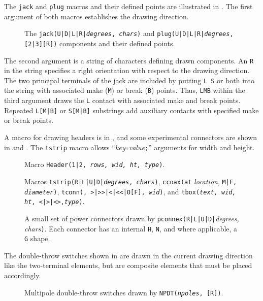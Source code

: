 The {\tt jack} and {\tt plug} macros and their defined points are
illustrated in .
The first argument of both macros establishes the drawing direction.
\begin{figure}[!ht]
   
   \vspace{-1ex}
   \caption{The {\tt jack(U|D|L|R|{\sl degrees}, {\sl chars})}
    and {\tt plug(U|D|L|R|{\sl degrees},[2|3][R])} components
    and their defined points.}
   \label{Jack}
   \end{figure}
 The second argument is a string of characters defining drawn components.
 An {\tt R} in the string specifies a
 right orientation with respect to the drawing direction.
 The two principal terminals of
 the jack are included by putting \hbox{{\tt L} {\tt S}}
 or both into the string with associated make ({\tt M})
 or break ({\tt B}) points.  Thus, {\tt LMB} within the third
 argument draws the {\tt L} contact with
 associated make and break points. Repeated {\tt L[M|B]}
 or {\tt S[M|B]} substrings add auxiliary contacts with 
 specified make or break points.

A macro for drawing headers is in ,
and some experimental connectors are shown in  and .
The {\tt tstrip} macro allows ``{\sl key}{\tt =}{\sl value}{\tt ;}'' arguments
for width and height.
\begin{figure}[h!b]
   
   \caption{Macro {\tt Header(1|2, {\sl rows, wid, ht, type})}.}
   \label{Headers}
   \end{figure}
\begin{figure}[h!b]
   
   \caption{Macros {\tt tstrip(R|L|U|D|{\sl degrees}, {\sl chars})},
     {\tt ccoax(at} {\sl location}, {\tt M|F, {\sl diameter})},
     {\tt tconn(\linespec, >|>>|<|<<|O[F], {\sl wid})}, and
     {\tt tbox({\sl text, wid, ht}, <|>|<>,{\sl type})}. }
   \label{Conn}
   \end{figure}

\begin{figure}[ht]
   
   \caption{A small set of power connectors drawn by
    {\tt pconnex(R|L|U|D|}{\sl degrees, chars}{\tt)}. Each connector has
    an internal {\tt H}, {\tt N}, and where applicable, a {\tt G} shape.}
   \label{Pconn}
   \end{figure}

The double-throw switches shown in  are drawn in the
current drawing direction like the two-terminal elements, but are
composite elements that must be placed accordingly.
\begin{figure}[h!t]
   \ifpdf{\vspace*{-1ex}}\fi%
   
   \caption{Multipole double-throw switches drawn by
    {\tt NPDT({\sl npoles}, [R])}.}
   \label{NPDT}
   \end{figure}

